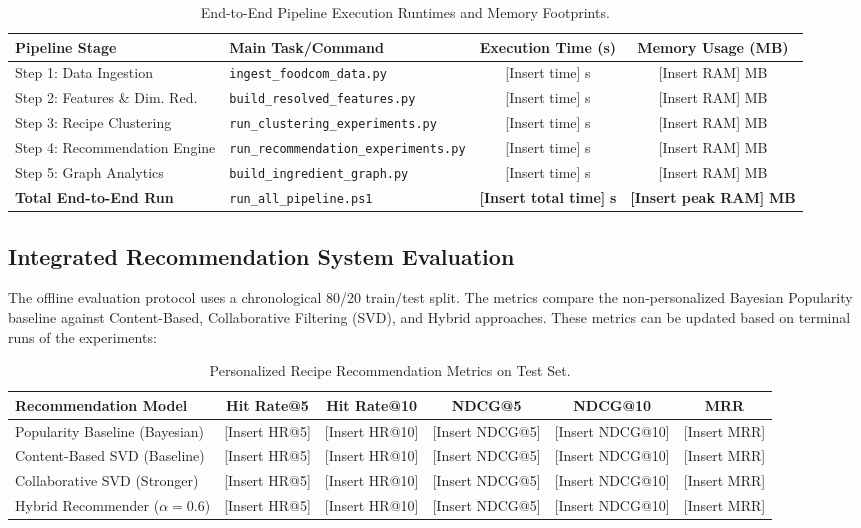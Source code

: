 \documentclass[11pt,a4paper]{article}
\begin{document}
\begin{table}[H]
\centering
\begin{tabular}{llcc}
\toprule
\textbf{Pipeline Stage} & \textbf{Main Task/Command} & \textbf{Execution Time (s)} & \textbf{Memory Usage (MB)} \\
\midrule
Step 1: Data Ingestion & \texttt{ingest\_foodcom\_data.py} & [Insert time] s & [Insert RAM] MB \\
Step 2: Features \& Dim. Red. & \texttt{build\_resolved\_features.py} & [Insert time] s & [Insert RAM] MB \\
Step 3: Recipe Clustering & \texttt{run\_clustering\_experiments.py} & [Insert time] s & [Insert RAM] MB \\
Step 4: Recommendation Engine & \texttt{run\_recommendation\_experiments.py} & [Insert time] s & [Insert RAM] MB \\
Step 5: Graph Analytics & \texttt{build\_ingredient\_graph.py} & [Insert time] s & [Insert RAM] MB \\
\midrule
\textbf{Total End-to-End Run} & \texttt{run\_all\_pipeline.ps1} & \textbf{[Insert total time]} \textbf{s} & \textbf{[Insert peak RAM]} \textbf{MB} \\
\bottomrule
\end{tabular}
\caption{End-to-End Pipeline Execution Runtimes and Memory Footprints.}
\label{tab:pipeline_runtime}
\end{table}

\subsection{Integrated Recommendation System Evaluation}
The offline evaluation protocol uses a chronological 80/20 train/test split. The metrics compare the non-personalized Bayesian Popularity baseline against Content-Based, Collaborative Filtering (SVD), and Hybrid approaches. These metrics can be updated based on terminal runs of the experiments:

\begin{table}[H]
\centering
\begin{tabular}{lccccc}
\toprule
\textbf{Recommendation Model} & \textbf{Hit Rate@5} & \textbf{Hit Rate@10} & \textbf{NDCG@5} & \textbf{NDCG@10} & \textbf{MRR} \\
\midrule
Popularity Baseline (Bayesian) & [Insert HR@5] & [Insert HR@10] & [Insert NDCG@5] & [Insert NDCG@10] & [Insert MRR] \\
Content-Based SVD (Baseline) & [Insert HR@5] & [Insert HR@10] & [Insert NDCG@5] & [Insert NDCG@10] & [Insert MRR] \\
Collaborative SVD (Stronger) & [Insert HR@5] & [Insert HR@10] & [Insert NDCG@5] & [Insert NDCG@10] & [Insert MRR] \\
Hybrid Recommender ($\alpha=0.6$) & [Insert HR@5] & [Insert HR@10] & [Insert NDCG@5] & [Insert NDCG@10] & [Insert MRR] \\
\bottomrule
\end{tabular}
\caption{Personalized Recipe Recommendation Metrics on Test Set.}
\label{tab:recommender_results_week14}
\end{table}
\end{document}
